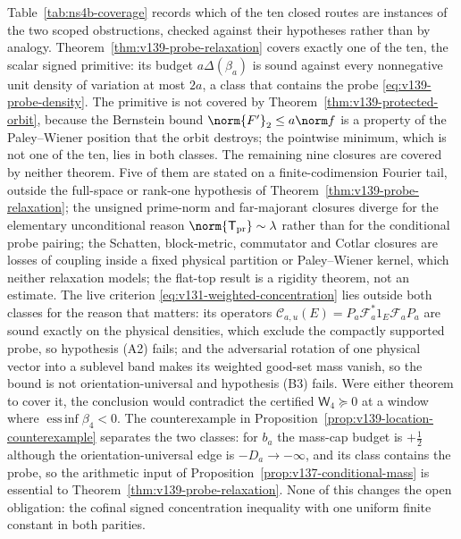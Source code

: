 Table~\ref{tab:ns4b-coverage} records which of the ten closed routes are
instances of the two scoped obstructions, checked against their
hypotheses rather than by analogy. Theorem~\ref{thm:v139-probe-relaxation}
covers exactly one of the ten, the scalar signed primitive: its budget
$a\Delta(\beta_a)$ is sound against every nonnegative unit density of
variation at most $2a$, a class that contains the probe
\eqref{eq:v139-probe-density}. The primitive is not covered by
Theorem~\ref{thm:v139-protected-orbit}, because the Bernstein bound
$\norm{F'}_2\le a\norm f$ is a property of the Paley--Wiener position
that the orbit destroys; the pointwise minimum, which is not one of the
ten, lies in both classes. The remaining nine
closures are covered by neither theorem. Five of them are stated on a
finite-codimension Fourier tail, outside the full-space or rank-one
hypothesis of Theorem~\ref{thm:v139-probe-relaxation}; the unsigned
prime-norm and far-majorant closures diverge for the elementary
unconditional reason $\norm{\mathsf T_{\rm pr}}\sim\lambda$ rather than for
the conditional probe pairing; the Schatten, block-metric, commutator and
Cotlar closures are losses of coupling inside a fixed physical partition
or Paley--Wiener kernel, which neither relaxation models; the flat-top
result is a rigidity theorem, not an estimate. The live criterion
\eqref{eq:v131-weighted-concentration} lies outside both classes for the
reason that matters: its operators
$\mathcal C_{a,u}(E)=P_a\mathcal F_a^*1_E\mathcal F_aP_a$ are sound
exactly on the physical densities, which exclude the compactly supported
probe, so hypothesis (A2) fails; and the adversarial rotation of one
physical vector into a sublevel band makes its weighted good-set mass
vanish, so the bound is not orientation-universal and hypothesis (B3)
fails. Were either theorem to cover it, the conclusion would contradict
the certified $\mathsf W_4\succeq0$ at a window where
$\operatorname*{ess\,inf}\beta_4<0$. The counterexample in
Proposition~\ref{prop:v139-location-counterexample} separates the two
classes: for $b_a$ the mass-cap budget is $+\tfrac12$ although the
orientation-universal edge is $-D_a\to-\infty$, and its class contains
the probe, so the arithmetic input of
Proposition~\ref{prop:v137-conditional-mass} is essential to
Theorem~\ref{thm:v139-probe-relaxation}. None of this changes the open
obligation: the cofinal signed concentration inequality with one uniform
finite constant in both parities.
